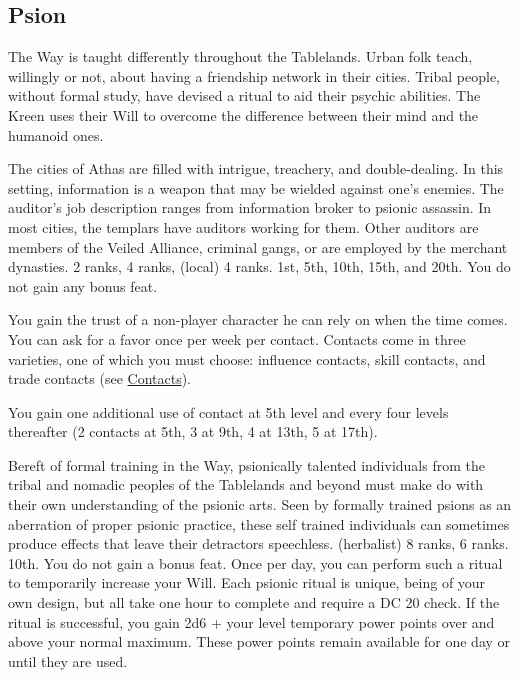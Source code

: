 \subsection{Psion}
The Way is taught differently throughout the Tablelands. Urban folk teach, willingly or not, about having a friendship network in their cities. Tribal people, without formal study, have devised a ritual to aid their psychic abilities. The Kreen uses their Will to overcome the difference between their mind and the humanoid ones.

{The cities of Athas are filled with intrigue, treachery, and double-dealing. In this setting, information is a weapon that may be wielded against one's enemies. The auditor's job description ranges from information broker to psionic assassin. In most cities, the templars have auditors working for them. Other auditors are members of the Veiled Alliance, criminal gangs, or are employed by the merchant dynasties.}
{ 2 ranks,  4 ranks,  (local) 4 ranks.}
{1st, 5th, 10th, 15th, and 20th.}
{You do not gain any bonus feat.}
{
	You gain the trust of a non-player character he can rely on when the time comes. You can ask for a favor once per week per contact. Contacts come in three varieties, one of which you must choose: influence contacts, skill contacts, and trade contacts (see \hyperref[sec:contacts]{Contacts}).

	You gain one additional use of contact at 5th level and every four levels thereafter (2 contacts at 5th, 3 at 9th, 4 at 13th, 5 at 17th).
}
{Bereft of formal training in the Way, psionically talented individuals from the tribal and nomadic peoples of the Tablelands and beyond must make do with their own understanding of the psionic arts. Seen by formally trained psions as an aberration of proper psionic practice, these self trained individuals can sometimes produce effects that leave their detractors speechless.}
{ (herbalist) 8 ranks,  6 ranks.}
{10th.}
{You do not gain a bonus feat.}
{
	Once per day, you can perform such a ritual to temporarily increase your Will. Each psionic ritual is unique, being of your own design, but all take one hour to complete and require a DC 20  check. If the ritual is successful, you gain 2d6 + your level temporary power points over and above your normal maximum. These power points remain available for one day or until they are used.
}

